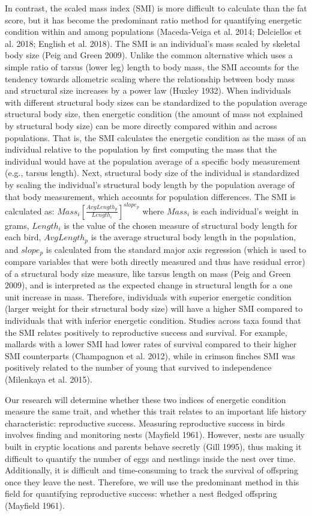 \documentclass[
]{article}
\begin{document}
In contrast, the scaled mass index (SMI) is more difficult to calculate
than the fat score, but it has become the predominant ratio method for
quantifying energetic condition within and among populations
(Maceda-Veiga et al. 2014; Delciellos et al. 2018; English et al. 2018).
The SMI is an individual's mass scaled by skeletal body size (Peig and
Green 2009). Unlike the common alternative which uses a simple ratio of
tarsus (lower leg) length to body mass, the SMI accounts for the
tendency towards allometric scaling where the relationship between body
mass and structural size increases by a power law (Huxley 1932). When
individuals with different structural body sizes can be standardized to
the population average structural body size, then energetic condition
(the amount of mass not explained by structural body size) can be more
directly compared within and across populations. That is, the SMI
calculates the energetic condition as the mass of an individual relative
to the population by first computing the mass that the individual would
have at the population average of a specific body measurement (e.g.,
tarsus length). Next, structural body size of the individual is
standardized by scaling the individual's structural body length by the
population average of that body measurement, which accounts for
population differences. The SMI is calculated as:
\(Mass_i\left[ \frac{AvgLength_p}{Length_i} \right]^{slope_p}\) where
\(Mass_i\) is each individual's weight in grams, \(Length_i\) is the
value of the chosen measure of structural body length for each bird,
\(AvgLength_p\) is the average structural body length in the population,
and \(slope_p\) is calculated from the standard major axis regression
(which is used to compare variables that were both directly measured and
thus have residual error) of a structural body size measure, like tarsus
length on mass (Peig and Green 2009), and is interpreted as the expected
change in structural length for a one unit increase in mass. Therefore,
individuals with superior energetic condition (larger weight for their
structural body size) will have a higher SMI compared to individuals
that with inferior energetic condition. Studies across taxa found that
the SMI relates positively to reproductive success and survival. For
example, mallards with a lower SMI had lower rates of survival compared
to their higher SMI counterparts (Champagnon et al. 2012), while in
crimson finches SMI was positively related to the number of young that
survived to independence (Milenkaya et al. 2015).

Our research will determine whether these two indices of energetic
condition measure the same trait, and whether this trait relates to an
important life history characteristic: reproductive success. Measuring
reproductive success in birds involves finding and monitoring nests
(Mayfield 1961). However, nests are usually built in cryptic locations
and parents behave secretly (Gill 1995), thus making it difficult to
quantify the number of eggs and nestlings inside the nest over time.
Additionally, it is difficult and time-consuming to track the survival
of offspring once they leave the nest. Therefore, we will use the
predominant method in this field for quantifying reproductive success:
whether a nest fledged offspring (Mayfield 1961).
\end{document}
